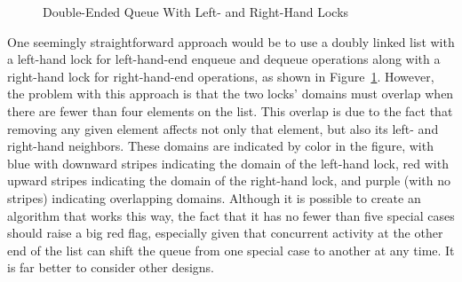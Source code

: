 \begin{figure}[tb]
\centering
{}
\caption{Double-Ended Queue With Left- and Right-Hand Locks}
\label{fig:SMPdesign:Double-Ended Queue With Left- and Right-Hand Locks}
\end{figure}

One seemingly straightforward approach would be to use a doubly
linked list with a left-hand lock
for left-hand-end enqueue and dequeue operations along with a right-hand
lock for right-hand-end operations, as shown in
Figure~\ref{fig:SMPdesign:Double-Ended Queue With Left- and Right-Hand Locks}.
However, the problem with this approach is that the two locks'
domains must overlap when there are fewer than four elements on the
list.
This overlap is due to the fact that removing any given element affects
not only that element, but also its left- and right-hand neighbors.
These domains are indicated by color in the figure, with blue
with downward stripes indicating
the domain of the left-hand lock, red with upward stripes
indicating the domain of the right-hand
lock, and purple (with no stripes) indicating overlapping domains.
Although it is possible to create an algorithm that works this way,
the fact that it has no fewer than five special cases should raise
a big red flag, especially given that concurrent activity at the other
end of the list can shift the queue from one special case to another
at any time.
It is far better to consider other designs.


